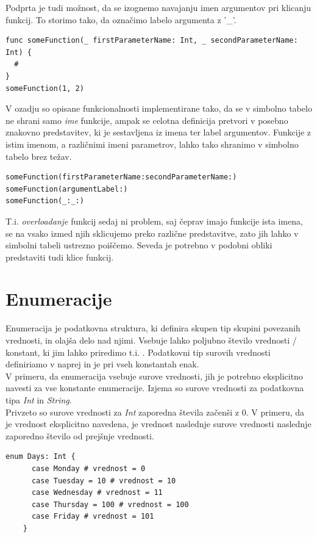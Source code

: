 \documentclass[a4paper, 12p]{book}
\begin{document}
Podprta je tudi možnost, da se izognemo navajanju imen argumentov pri klicanju funkcij. To storimo tako, da označimo labelo argumenta z '\_'.

\begin{lstlisting}[caption={}, captionpos=b]
func someFunction(_ firstParameterName: Int, _ secondParameterName: Int) {
  #
}
someFunction(1, 2)
\end{lstlisting}

V ozadju so opisane funkcionalnosti implementirane tako, da se v simbolno tabelo ne shrani samo \textit{ime} funkcije, ampak se celotna definicija pretvori v posebno znakovno predstavitev, ki je sestavljena iz imena ter label argumentov. Funkcije z istim imenom, a različnimi imeni parametrov, lahko tako shranimo v simbolno tabelo brez težav.

\begin{lstlisting}[caption={Znakovne predstavitve funkcij.}, captionpos=b]
someFunction(firstParameterName:secondParameterName:)
someFunction(argumentLabel:)
someFunction(_:_:)
\end{lstlisting}

T.i. \textit{overloadanje} funkcij sedaj ni problem, saj čeprav imajo funkcije ista imena, se na vsako izmed njih sklicujemo preko različne predstavitve, zato jih lahko v simbolni tabeli ustrezno poiščemo. Seveda je potrebno v podobni obliki predstaviti tudi klice funkcij.

\section{Enumeracije}

Enumeracija je podatkovna struktura, ki definira skupen tip skupini povezanih vrednosti, in olajša delo nad njimi. Vsebuje lahko poljubno število vrednosti / konstant, ki jim lahko priredimo t.i. . Podatkovni tip surovih vrednosti definiriamo v naprej in je pri vseh konstantah enak. \\
\indent V primeru, da enumeracija vsebuje surove vrednosti, jih je potrebno eksplicitno navesti za vse konstante enumeracije. Izjema so surove vrednosti za podatkovna tipa \textit{Int} in \textit{String}. \\
\indent Privzeto so surove vrednosti za \textit{Int} zaporedna števila začenši z 0. V primeru, da je vrednost eksplicitno navedena, je vrednost naslednje surove vrednosti naslednje zaporedno število od prejšnje vrednosti.

\begin{lstlisting}[caption={Enumeracija s surovimi vrednostmi tipa Int.}, captionpos=b]
	enum Days: Int {
	  case Monday # vrednost = 0
	  case Tuesday = 10 # vrednost = 10
	  case Wednesday # vrednost = 11
	  case Thursday = 100 # vrednost = 100
	  case Friday # vrednost = 101
	}
\end{lstlisting}
\end{document}
